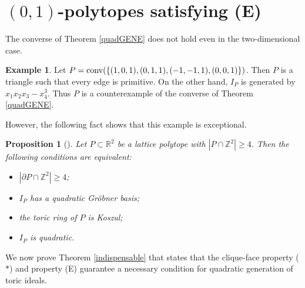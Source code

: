 \documentclass[12pt]{amsart}
\newtheorem{prop}[thm]{Proposition}
\theoremstyle{definition}
\newtheorem{example}[thm]{Example}
\numberwithin{thm}{section}
\numberwithin{equation}{section}
\def\NZQ{\mathbb}               %
\def\ZZ{{\NZQ Z}}
\def\RR{{\NZQ R}}
\begin{document}
\section{$(0,1)$-polytopes satisfying (E)}

The converse of Theorem \ref{quadGENE} does not hold even in the two-dimensional case.


\begin{example}\label{counterexam}
Let 
    $P={\rm conv} (\{(1,0,1),(0,1,1),(-1,-1,1), (0,0,1)\})$.
Then $P$ is a triangle such that every edge is primitive.
On the other hand, $I_P$ is generated by $x_1 x_2 x_3 - x_4^3$.
    Thus $P$ is a counterexample of the converse of Theorem \ref{quadGENE}.

\end{example}

However, the following fact shows that this example is exceptional.

\begin{prop}[{\cite[Corollary 3.2.5]{BGT}}]
Let $P \subset \RR^2$ be a lattice polytope with $|P \cap \ZZ^2| \ge 4$.
Then the following conditions are equivalent:
\begin{itemize}
    \item[{\rm (i)}] $|\partial P \cap \ZZ^2| \ge 4${\rm ;}
    \item[{\rm (ii)}] $I_P$ has a quadratic Gr\"{o}bner basis{\rm ;}
    \item[{\rm (iii)}] the toric ring of $P$ is Koszul{\rm ;}
    \item[{\rm (iv)}] $I_P$ is quadratic.
\end{itemize}
    
\end{prop}

We now prove Theorem \ref{indispensable} that states that the clique-face property ($*$) and property (E) guarantee 
a necessary condition for quadratic generation of toric ideals.
    
\end{document}
